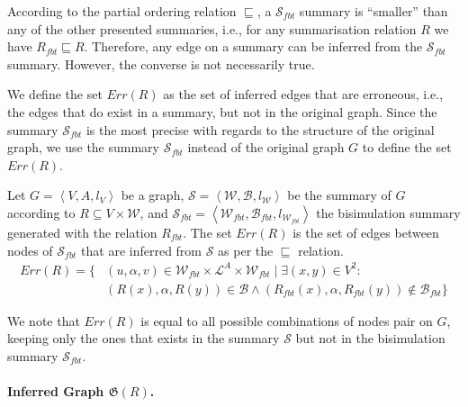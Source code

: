 According to the partial ordering relation $\sqsubseteq$, a $\mathcal{S}_{fbt}$ summary is ``smaller'' than any of the other presented summaries, i.e., for any summarisation relation $R$ we have $R_{fbt} \sqsubseteq R$. Therefore, any edge on a summary can be inferred from the $\mathcal{S}_{fbt}$ summary. However, the converse is not necessarily true.

We define the set $Err(R)$ as the set of inferred edges that are erroneous, i.e., the edges that do exist in a summary, but not in the original graph. Since the summary $\mathcal{S}_{fbt}$ is the most precise with regards to the structure of the original graph, we use the summary $\mathcal{S}_{fbt}$ instead of the original graph $G$ to define the set $Err(R)$.

\begin{definition}
Let $G=\left\langle V, A, l_V \right\rangle$ be a graph, $\mathcal{S} = \left\langle \mathcal{W}, \mathcal{B}, l_{\mathcal{W}} \right\rangle$ be the summary of $G$ according to $R \subseteq V \times \mathcal{W}$, and $\mathcal{S}_{fbt} = \left\langle \mathcal{W}_{fbt}, \mathcal{B}_{fbt}, l_{\mathcal{W}_{fbt}} \right\rangle$ the bisimulation summary generated with the relation $R_{fbt}$.
The set $Err(R)$ is the set of edges between nodes of $\mathcal{S}_{fbt}$ that are inferred from $\mathcal{S}$ as per the $\sqsubseteq$ relation.
\begin{equation*}
\begin{split}
Err(R) = \{ & (u, \alpha, v) \in \mathcal{W}_{fbt} \times \mathcal{L}^A \times \mathcal{W}_{fbt} \mid \exists (x, y) \in V^2 :\\
 & (R(x), \alpha, R(y)) \in \mathcal{B} \wedge (R_{fbt}(x), \alpha, R_{fbt}(y)) \not \in \mathcal{B}_{fbt} \}
\end{split}
\end{equation*}
\end{definition}

We note that $Err(R)$ is equal to all possible combinations of nodes pair on $G$, keeping only the ones that exists in the summary $\mathcal{S}$ but not in the bisimulation summary $\mathcal{S}_{fbt}$.

\paragraph{Inferred Graph $\mathfrak{G}(R)$.}

